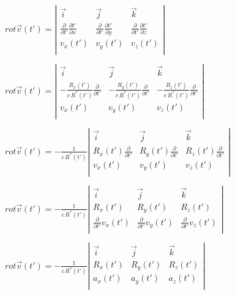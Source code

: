 \documentclass[11pt]{article}
\begin{document}
    \(rot \overrightarrow{v}\left(t'\right)=\left|\begin{array}{ccc}  \vec i & \vec j & \vec k\\  \frac{\partial}{\partial t'}\frac{\partial t'}{\partial x} & \frac{\partial}{\partial t'}\frac{\partial t'}{\partial y} & \frac{\partial}{\partial t'}\frac{\partial t'}{\partial z}\\  v_{x}\left(t'\right) & v_{y}\left(t'\right) & v_{z}\left(t'\right)\\ \end{array}\right|\)

    \(rot \overrightarrow{v}\left(t'\right)=\left|\begin{array}{ccc}  \vec i & \vec j & \vec k \\  -\frac{R_x\left(t'\right)}{c\,{{R}^{*}}\left(t'\right)}\frac{\partial}{\partial t'}  & -\frac{R_y\left(t'\right)}{c\,{{R}^{*}}\left(t'\right)}\frac{\partial}{\partial t'}  & -\frac{R_z\left(t'\right)}{c\,{{R}^{*}}\left(t'\right)}\frac{\partial}{\partial t'} \\  v_{x}\left(t'\right) & v_{y}\left(t'\right) & v_{z}\left(t'\right)\\ \end{array}\right|\)

    \(rot \overrightarrow{v}\left(t'\right)=-\frac{1}{c\,{{R}^{*}}\left(t'\right)}\left|\begin{array}{ccc}  \vec i & \vec j & \vec k \\  R_x\left(t'\right)\frac{\partial}{\partial t'}  & R_y\left(t'\right)\frac{\partial}{\partial t'}  & R_z\left(t'\right)\frac{\partial}{\partial t'} \\  v_{x}\left(t'\right) & v_{y}\left(t'\right) & v_{z}\left(t'\right)\\ \end{array}\right|\)

    \(rot \overrightarrow{v}\left(t'\right)=-\frac{1}{c\,{{R}^{*}}\left(t'\right)}\left|\begin{array}{ccc}  \vec i & \vec j & \vec k \\  R_x\left(t'\right)  & R_y\left(t'\right)  & R_z\left(t'\right) \\  \frac{\partial}{\partial t'}v_{x}\left(t'\right)  & \frac{\partial}{\partial t'} v_{y}\left(t'\right)  & \frac{\partial}{\partial t'} v_{z}\left(t'\right)\\ \end{array}\right|\)

    \(rot \overrightarrow{v}\left(t'\right)=-\frac{1}{c\,{{R}^{*}}\left(t'\right)}\left|\begin{array}{ccc}  \vec i & \vec j & \vec k \\  R_x\left(t'\right)  & R_y\left(t'\right)  & R_z\left(t'\right) \\  a_{x}\left(t'\right)  & a_{y}\left(t'\right)  & a_{z}\left(t'\right)\\ \end{array}\right|\)
\end{document}
